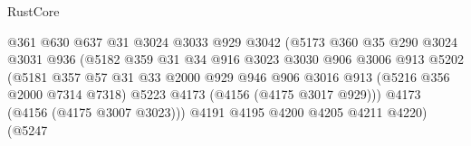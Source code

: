 \begin{lexlean}{RustCore}
\begin{coremodule}
                                          @361
                                          @630
                                          @637
                                          @31
                                          @3024
                                          @3033
                                          @929
                                          @3042
                                          (@5173
                                            @360
                                            @35
                                            @290
                                            @3024
                                            @3031
                                            @936
                                            (@5182
                                              @359
                                              @31
                                              @34
                                              @916
                                              @3023
                                              @3030
                                              @906
                                              @3006
                                              @913
                                              @5202
                                              (@5181
                                                @357
                                                @57
                                                @31
                                                @33
                                                @2000
                                                @929
                                                @946
                                                @906
                                                @3016
                                                @913
                                                (@5216 @356 @2000 @7314 @7318)
                                                @5223
                                                @4173
                                                (@4156 (@4175 @3017 @929)))
                                              @4173
                                              (@4156 (@4175 @3007 @3023)))
                                            @4191
                                            @4195
                                            @4200
                                            @4205
                                            @4211
                                            @4220)
                                          (@5247

\end{coremodule}
\end{lexlean}
